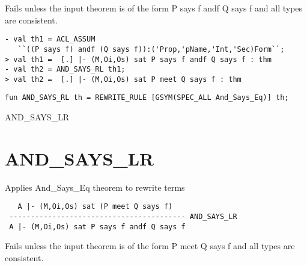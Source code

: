 \FAILURE Fails unless the input theorem is of the form P says f andf Q
says f and all types are consistent.

\EXAMPLE
\begin{holboxed}
\begin{verbatim}
- val th1 = ACL_ASSUM 
   ``((P says f) andf (Q says f)):('Prop,'pName,'Int,'Sec)Form``;
> val th1 =  [.] |- (M,Oi,Os) sat P says f andf Q says f : thm
- val th2 = AND_SAYS_RL th1;
> val th2 =  [.] |- (M,Oi,Os) sat P meet Q says f : thm
\end{verbatim}
\end{holboxed}
\IMPLEMENTATION
\begin{holboxed}
\begin{verbatim}
fun AND_SAYS_RL th = REWRITE_RULE [GSYM(SPEC_ALL And_Says_Eq)] th;
\end{verbatim}
\end{holboxed}

\SEEALSO
AND\_SAYS\_LR
\ENDDOC

\section{AND\_SAYS\_LR}




\egroup

\SYNOPSIS
Applies And_Says_Eq theorem to rewrite terms

\DESCRIBE

\begin{verbatim}
   A |- (M,Oi,Os) sat (P meet Q says f)
 ----------------------------------------- AND_SAYS_LR
 A |- (M,Oi,Os) sat P says f andf Q says f
\end{verbatim}

\FAILURE 
Fails unless the input theorem is of the form P meet Q says f and all
types are consistent.

